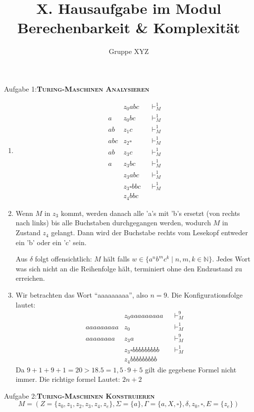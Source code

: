\documentclass[a4paper,onecolumn,oneside,12pt,ngerman]{article}
\date{}
\title{X. Hausaufgabe im Modul \\ \glqq Berechenbarkeit \& Komplexität\grqq} %
\author{Gruppe XYZ} %
\theoremstyle{plain} %
\theoremstyle{definition} %
\theoremstyle{remark} %
\theoremstyle{plain}
\newcommand{\NN}{\mathbb{N}} %
\newcommand{\tstep}[1][1]{\vdash^#1_M} %
\begin{document}

\maketitle
\newpage
Aufgabe 1:\quad\textsc{\textbf{Turing-Maschinen Analysieren}}
\begin{enumerate}
    \item[(a)]
    \begin{align*}
    &z_0abc  &&\tstep  \\
    a&z_0bc   &&\tstep  \\
    ab&z_1c    &&\tstep  \\
    abc&z_2\square     &&\tstep  \\
    ab&z_3c    &&\tstep  \\
    a&z_3bc   &&\tstep  \\
    &z_3abc  &&\tstep  \\
    &z_3\square bbc  &&\tstep \\
    &z_4bbc
    \end{align*}
    
    \item[(b)] 
    Wenn $M$ in $z_3$ kommt, werden danach alle 'a's mit 'b's ersetzt (von rechts nach links) bis alle Buchstaben durchgegangen werden, wodurch $M$ in Zustand $z_4$ gelangt. Dann wird der Buchstabe rechts vom Lesekopf entweder ein 'b' oder ein 'c' sein.

    Aus $\delta$ folgt offensichtlich: $M$ hält falls $w\in \{a^nb^mc^k\mid n,m,k \in \NN\}$. Jedes Wort was sich nicht an die Reihenfolge hält, terminiert ohne den Endzustand zu erreichen.
    \item[(c)] 
    Wir betrachten das Wort \enquote{aaaaaaaaa}, also $n=9$. Die Konfigurationsfolge lautet:
    \begin{align*}
    &z_0aaaaaaaaa          &&\tstep[9]  \\
    aaaaaaaaa&z_0         &&\tstep  \\
    aaaaaaaa&z_3a         &&\tstep[9]  \\
    &z_3\square bbbbbbbbb  &&\tstep  \\
    &z_4bbbbbbbbb
\end{align*}
    Da $9+1+9+1 = 20 > 18.5 = 1,5\cdot 9 + 5$ gilt die gegebene Formel nicht immer. Die richtige formel Lautet: $2n+2$
\end{enumerate}
\newpage
Aufgabe 2:\quad \textsc{\textbf{Turing-Maschinen Konstruieren}}
\[ M = (Z = \{z_0, z_1, z_2, z_3, z_4, z_e\}, \Sigma = \{a\}, \Gamma = \{a,X,\square\},\delta, z_0, \square, E = \{z_e\}) \]
\end{document}
